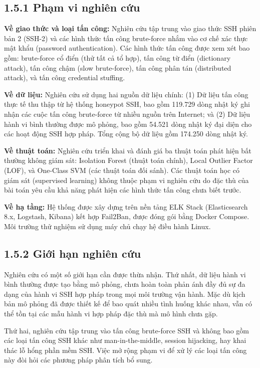 \documentclass[
  a4paper]{report}
\begin{document}
\subsection{1.5.1 Phạm vi nghiên
cứu}\label{phux1ea1m-vi-nghiuxean-cux1ee9u}

\textbf{Về giao thức và loại tấn công:} Nghiên cứu tập trung vào giao
thức SSH phiên bản 2 (SSH-2) và các hình thức tấn công brute-force nhắm
vào cơ chế xác thực mật khẩu (password authentication). Các hình thức
tấn công được xem xét bao gồm: brute-force cổ điển (thử tất cả tổ hợp),
tấn công từ điển (dictionary attack), tấn công chậm (slow brute-force),
tấn công phân tán (distributed attack), và tấn công credential stuffing.

\textbf{Về dữ liệu:} Nghiên cứu sử dụng hai nguồn dữ liệu chính: (1) Dữ
liệu tấn công thực tế thu thập từ hệ thống honeypot SSH, bao gồm 119.729
dòng nhật ký ghi nhận các cuộc tấn công brute-force từ nhiều nguồn trên
Internet; và (2) Dữ liệu hành vi bình thường được mô phỏng, bao gồm
54.521 dòng nhật ký đại diện cho các hoạt động SSH hợp pháp. Tổng cộng
bộ dữ liệu gồm 174.250 dòng nhật ký.

\textbf{Về thuật toán:} Nghiên cứu triển khai và đánh giá ba thuật toán
phát hiện bất thường không giám sát: Isolation Forest (thuật toán
chính), Local Outlier Factor (LOF), và One-Class SVM (các thuật toán đối
sánh). Các thuật toán học có giám sát (supervised learning) không thuộc
phạm vi nghiên cứu do đặc thù của bài toán yêu cầu khả năng phát hiện
các hình thức tấn công chưa biết trước.

\textbf{Về hạ tầng:} Hệ thống được xây dựng trên nền tảng ELK Stack
(Elasticsearch 8.x, Logstash, Kibana) kết hợp Fail2Ban, được đóng gói
bằng Docker Compose. Môi trường thử nghiệm sử dụng máy chủ chạy hệ điều
hành Linux.

\subsection{1.5.2 Giới hạn nghiên
cứu}\label{giux1edbi-hux1ea1n-nghiuxean-cux1ee9u}

Nghiên cứu có một số giới hạn cần được thừa nhận. Thứ nhất, dữ liệu hành
vi bình thường được tạo bằng mô phỏng, chưa hoàn toàn phản ánh đầy đủ sự
đa dạng của hành vi SSH hợp pháp trong mọi môi trường vận hành. Mặc dù
kịch bản mô phỏng đã được thiết kế để bao quát nhiều tình huống khác
nhau, vẫn có thể tồn tại các mẫu hành vi hợp pháp đặc thù mà mô hình
chưa gặp.

Thứ hai, nghiên cứu tập trung vào tấn công brute-force SSH và không bao
gồm các loại tấn công SSH khác như man-in-the-middle, session hijacking,
hay khai thác lỗ hổng phần mềm SSH. Việc mở rộng phạm vi để xử lý các
loại tấn công này đòi hỏi các phương pháp phân tích bổ sung.
\end{document}
